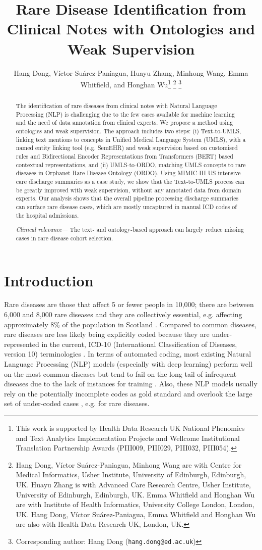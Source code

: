 \documentclass[letterpaper, 10 pt, conference]{ieeeconf}
\title{\LARGE \bf
Rare Disease Identification from Clinical Notes with Ontologies and Weak Supervision
}
\author{Hang Dong, Víctor Suárez-Paniagua, Huayu Zhang, Minhong Wang, Emma Whitfield, and Honghan Wu\thanks{This work is supported by Health Data Research UK National Phenomics and Text Analytics Implementation Projects and Wellcome Institutional Translation Partnership Awards (PIII009, PIII029, PIII032, PIII054).}
\thanks{Hang Dong, Víctor Suárez-Paniagua, Minhong Wang are with Centre for Medical Informatics, Usher Institute, University of Edinburgh, Edinburgh, UK. Huayu Zhang is with Advanced Care Research Centre, Usher Institute, University of Edinburgh, Edinburgh, UK. Emma Whitfield and Honghan Wu are with Institute of Health Informatics, University College London, London, UK. Hang Dong, Víctor Suárez-Paniagua, Emma Whitfield and Honghan Wu are also with Health Data Research UK, London, UK.}
\thanks{Corresponding author: Hang Dong ({\tt hang.dong@ed.ac.uk})}
}
\begin{document}
\maketitle
\thispagestyle{empty}
\pagestyle{empty}

\begin{abstract}

The identification of rare diseases from clinical notes with Natural Language Processing (NLP) is challenging due to the few cases available for machine learning and the need of data annotation from clinical experts. We propose a method using ontologies and weak supervision. The approach includes two steps: (i) Text-to-UMLS, linking text mentions to concepts in Unified Medical Language System (UMLS), with a named entity linking tool (e.g. SemEHR) and weak supervision based on customised rules and Bidirectional Encoder Representations from Transformers (BERT) based contextual representations, and (ii) UMLS-to-ORDO, matching UMLS concepts to rare diseases in Orphanet Rare Disease Ontology (ORDO). Using MIMIC-III US intensive care discharge summaries as a case study, we show that the Text-to-UMLS process can be greatly improved with weak supervision, without any annotated data from domain experts. Our analysis shows that the overall pipeline processing discharge summaries can surface rare disease cases, which are mostly uncaptured in manual ICD codes of the hospital admissions.
\newline

\indent \textit{Clinical relevance}— The text- and ontology-based approach can largely reduce missing cases in rare disease cohort selection.
\end{abstract}

\section{Introduction}
\label{intro}
Rare diseases are those that affect 5 or fewer people in 10,000; there are between 6,000 and 8,000 rare diseases and they are collectively essential, e.g. affecting approximately 8\% of the population in Scotland \cite{scot_gov_2021}. Compared to common diseases, rare diseases are less likely being explicitly coded because they are under-represented in the current, ICD-10 (International Classification of Diseases, version 10) terminologies \cite{Bearryman2016}. In terms of automated coding, most existing Natural Language Processing (NLP) models (especially with deep learning) perform well on the most common diseases but tend to fail on the long tail of infrequent diseases due to the lack of instances for training \cite{rios-kavuluru-2018-shot,dong2021}. Also, these NLP models usually rely on the potentially incomplete codes as gold standard and overlook the large set of under-coded cases \cite{searle2020}, e.g. for rare diseases.
\end{document}
